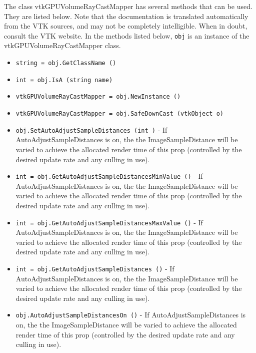 The class vtkGPUVolumeRayCastMapper has several methods that can be used.
  They are listed below.
Note that the documentation is translated automatically from the VTK sources,
and may not be completely intelligible.  When in doubt, consult the VTK website.
In the methods listed below, \verb|obj| is an instance of the vtkGPUVolumeRayCastMapper class.
\begin{itemize}
\item  \verb|string = obj.GetClassName ()|

\item  \verb|int = obj.IsA (string name)|

\item  \verb|vtkGPUVolumeRayCastMapper = obj.NewInstance ()|

\item  \verb|vtkGPUVolumeRayCastMapper = obj.SafeDownCast (vtkObject o)|

\item  \verb|obj.SetAutoAdjustSampleDistances (int )| -  If AutoAdjustSampleDistances is on, the the ImageSampleDistance
 will be varied to achieve the allocated render time of this
 prop (controlled by the desired update rate and any culling in
 use).

\item  \verb|int = obj.GetAutoAdjustSampleDistancesMinValue ()| -  If AutoAdjustSampleDistances is on, the the ImageSampleDistance
 will be varied to achieve the allocated render time of this
 prop (controlled by the desired update rate and any culling in
 use).

\item  \verb|int = obj.GetAutoAdjustSampleDistancesMaxValue ()| -  If AutoAdjustSampleDistances is on, the the ImageSampleDistance
 will be varied to achieve the allocated render time of this
 prop (controlled by the desired update rate and any culling in
 use).

\item  \verb|int = obj.GetAutoAdjustSampleDistances ()| -  If AutoAdjustSampleDistances is on, the the ImageSampleDistance
 will be varied to achieve the allocated render time of this
 prop (controlled by the desired update rate and any culling in
 use).

\item  \verb|obj.AutoAdjustSampleDistancesOn ()| -  If AutoAdjustSampleDistances is on, the the ImageSampleDistance
 will be varied to achieve the allocated render time of this
 prop (controlled by the desired update rate and any culling in
 use).


\end{itemize}
